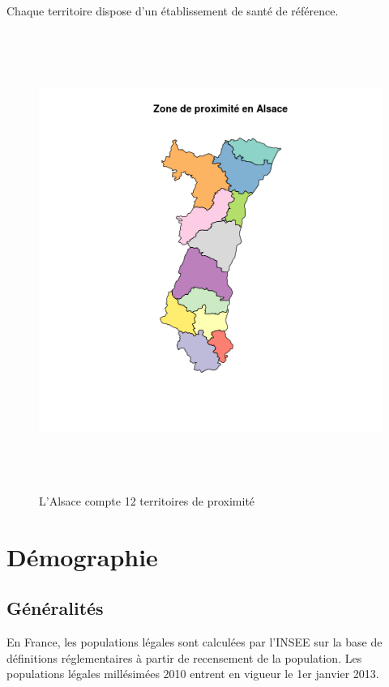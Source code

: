 \documentclass[12pt,english,french,twoside]{book}\usepackage[]{graphicx}\usepackage[]{color}
\begin{document}
Chaque territoire dispose d'un établissement de santé de référence.

\begin{figure}[ht]
 \centering
 \includegraphics[height=15cm,keepaspectratio=true]{../doc/cartographie/RPU2013_Carto_Pop/figure/zone_proximite.png}
 \caption{L'Alsace compte 12 territoires de proximité}
 \label{fig:zp}
\end{figure}

\section{Démographie}
\subsection{Généralités}

En France, les populations légales sont calculées par l'INSEE sur la base de définitions réglementaires à partir de recensement de la population. 
Les populations légales millésimées 2010 entrent en vigueur le 1er janvier 2013.  
\end{document}
